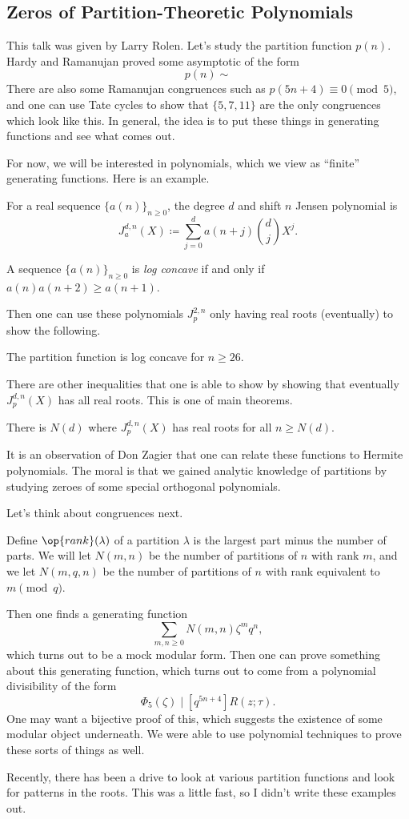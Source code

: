 \documentclass{article}
\begin{document}
\subsection{Zeros of Partition-Theoretic Polynomials}
This talk was given by Larry Rolen. Let's study the partition function $p(n)$. Hardy and Ramanujan proved some asymptotic of the form
\[p(n)\sim\]
There are also some Ramanujan congruences such as $p(5n+4)\equiv0\pmod5$, and one can use Tate cycles to show that $\{5,7,11\}$ are the only congruences which look like this. In general, the idea is to put these things in generating functions and see what comes out.

For now, we will be interested in polynomials, which we view as ``finite'' generating functions. Here is an example.
\begin{definition}
	For a real sequence $\{a(n)\}_{n\ge0}$, the degree $d$ and shift $n$ Jensen polynomial is
	\[J_a^{d,n}(X)\coloneqq\sum_{j=0}^da(n+j)\binom djX^j.\]
\end{definition}
\begin{definition}
	A sequence $\{a(n)\}_{n\ge0}$ is \textit{log concave} if and only if $a(n)a(n+2)\ge a(n+1)$.
\end{definition}
Then one can use these polynomials $J_p^{2,n}$ only having real roots (eventually) to show the following.
\begin{theorem}
	The partition function is log concave for $n\ge26$.
\end{theorem}
There are other inequalities that one is able to show by showing that eventually $J_p^{d,n}(X)$ has all real roots. This is one of main theorems.
\begin{theorem}
	There is $N(d)$ where $J_p^{d,n}(X)$ has real roots for all $n\ge N(d)$.
\end{theorem}
It is an observation of Don Zagier that one can relate these functions to Hermite polynomials. The moral is that we gained analytic knowledge of partitions by studying zeroes of some special orthogonal polynomials.

Let's think about congruences next.
\begin{definition}
	Define $\op{rank}(\lambda)$ of a partition $\lambda$ is the largest part minus the number of parts. We will let $N(m,n)$ be the number of partitions of $n$ with rank $m$, and we let $N(m,q,n)$ be the number of partitions of $n$ with rank equivalent to $m\pmod q$.
\end{definition}
Then one finds a generating function
\[\sum_{m,n\ge0}N(m,n)\zeta^mq^n,\]
which turns out to be a mock modular form. Then one can prove something about this generating function, which turns out to come from a polynomial divisibility of the form
\[\Phi_5(\zeta)\mid\left[q^{5n+4}\right]R(z;\tau).\]
One may want a bijective proof of this, which suggests the existence of some modular object underneath. We were able to use polynomial techniques to prove these sorts of things as well.
\begin{remark}
	Recently, there has been a drive to look at various partition functions and look for patterns in the roots. This was a little fast, so I didn't write these examples out.
\end{remark}
\end{document}
